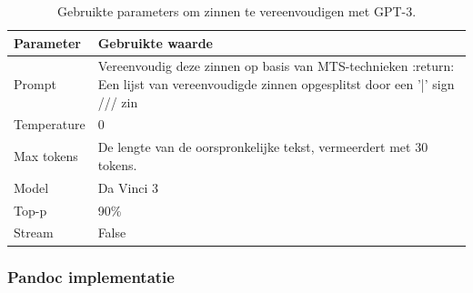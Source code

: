 \begin{center}
	\begin{table}[H]
		\begin{tabular}{| m{5cm}| m{8cm} |}
			\hline
			Parameter & Gebruikte waarde \\ \hline
			Prompt & Vereenvoudig deze zinnen op basis van {MTS-technieken} :return: Een lijst van vereenvoudigde zinnen opgesplitst door een '|' sign /// {zin} \\ \hline
			Temperature & 0 \\ \hline
			Max tokens & De lengte van de oorspronkelijke tekst, vermeerdert met 30 tokens. \\ \hline
			Model & Da Vinci 3 \\ \hline
			Top-p & 90\% \\ \hline
			Stream & False \\ \hline
		\end{tabular}
		\caption{Gebruikte parameters om zinnen te vereenvoudigen met GPT-3.}
		\label{table:gpt-3-sentence-simplification}
	\end{table}
\end{center}

\subsubsection{Pandoc implementatie}

